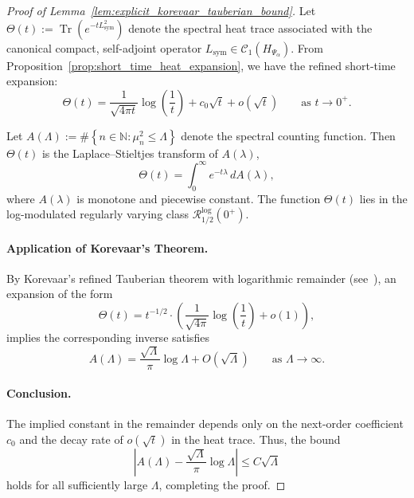 \begin{proof}[Proof of Lemma~\ref{lem:explicit_korevaar_tauberian_bound}]
Let \( \Theta(t) := \operatorname{Tr}(e^{-t L_{\mathrm{sym}}^2}) \) denote the spectral heat trace associated with the canonical compact, self-adjoint operator \( L_{\mathrm{sym}} \in \mathcal{C}_1(H_{\Psi_\alpha}) \). From Proposition~\ref{prop:short_time_heat_expansion}, we have the refined short-time expansion:
\[
\Theta(t) = \frac{1}{\sqrt{4\pi t}} \log\left( \frac{1}{t} \right) + c_0 \sqrt{t} + o(\sqrt{t}) \qquad \text{as } t \to 0^+.
\]

Let \( A(\Lambda) := \#\left\{ n \in \mathbb{N} : \mu_n^2 \le \Lambda \right\} \) denote the spectral counting function. Then \( \Theta(t) \) is the Laplace–Stieltjes transform of \( A(\lambda) \),
\[
\Theta(t) = \int_0^\infty e^{-t \lambda} \, dA(\lambda),
\]
where \( A(\lambda) \) is monotone and piecewise constant. The function \( \Theta(t) \) lies in the log-modulated regularly varying class \( \mathcal{R}_{1/2}^{\log}(0^+) \).

\paragraph{Application of Korevaar’s Theorem.}
By Korevaar’s refined Tauberian theorem with logarithmic remainder (see~\cite[Ch.~III, Thm.~5.5]{Korevaar2004Tauberian}), an expansion of the form
\[
\Theta(t) = t^{-1/2} \cdot \left( \frac{1}{\sqrt{4\pi}} \log\left( \frac{1}{t} \right) + o(1) \right),
\]
implies the corresponding inverse satisfies
\[
A(\Lambda) = \frac{\sqrt{\Lambda}}{\pi} \log \Lambda + O(\sqrt{\Lambda}) \qquad \text{as } \Lambda \to \infty.
\]

\paragraph{Conclusion.}
The implied constant in the remainder depends only on the next-order coefficient \( c_0 \) and the decay rate of \( o(\sqrt{t}) \) in the heat trace. Thus, the bound
\[
\left| A(\Lambda) - \frac{\sqrt{\Lambda}}{\pi} \log \Lambda \right| \le C \sqrt{\Lambda}
\]
holds for all sufficiently large \( \Lambda \), completing the proof.
\end{proof}
